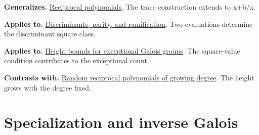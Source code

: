 \documentclass[11pt,a4paper,oneside,openany]{book}
\begin{document}
\color{black}\textbf{Generalizes.} \hyperlink{article:reciprocity}{Reciprocal polynomials}. The trace construction extends to x+b/x.\par
\color{black}\textbf{Applies to.} \hyperlink{article:discriminants}{Discriminants, parity, and ramification}. Two evaluations determine the discriminant square class.\par
\color{black}\textbf{Applies to.} \hyperlink{article:height-counting}{Height bounds for exceptional Galois groups}. The square-value condition contributes to the exceptional count.\par
\color{black}\textbf{Contrasts with.} \hyperlink{article:random-reciprocal}{Random reciprocal polynomials of growing degree}. The height grows with the degree fixed.\par
\endgroup
\part{Specialization and inverse Galois}
\end{document}
